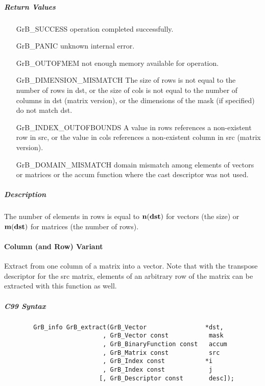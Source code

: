 \subparagraph{Return Values}


\begin{itemize}[leftmargin=2.1in]
\item[{\sf GrB\_SUCCESS}]     operation completed successfully.
\item[{\sf GrB\_PANIC}]        unknown internal error.
\item[{\sf GrB\_OUTOFMEM}]    not enough memory available for operation.
\item[{\sf GrB\_DIMENSION\_MISMATCH}] 
        The size of rows is not equal to the number of rows in dst, or
        the size of cols is not equal to the number of columns in dst (matrix version), or
        the dimensions of the mask (if specified) do not match dst.
\item[{\sf GrB\_INDEX\_OUTOFBOUNDS}]
        A value in rows references a non-existent row in src, or
        the value in cols references a non-existent column in src (matrix version).
\item[\sf GrB\_DOMAIN\_MISMATCH]  
       domain mismatch among elements of vectors or matrices or the accum function where the cast descriptor was not used.
\end{itemize}


\subparagraph{Description}

The number of elements in {\sf rows} is equal to $\bold{n}({\bf dst})$ for 
vectors (the size) or $\bold{m}({\bf dst})$ for matrices (the number of rows).


\paragraph{Column (and Row) Variant}

Extract from one column of a matrix into a vector.  Note that with the transpose
descriptor for the {\sf src} matrix, elements of an arbitrary row of the matrix
can be extracted with this function as well.

\subparagraph{C99 Syntax}

\begin{verbatim}
        GrB_info GrB_extract(GrB_Vector                *dst,
                           , GrB_Vector const           mask
                           , GrB_BinaryFunction const   accum
                           , GrB_Matrix const           src
                           , GrB_Index const           *i
                           , GrB_Index const            j
                          [, GrB_Descriptor const       desc]); 
\end{verbatim}


